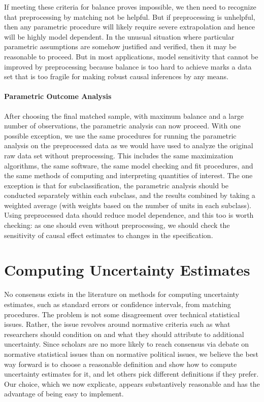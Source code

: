 \documentclass[11pt,titlepage]{article}
\begin{document}
If meeting these criteria for balance proves impossible, we then need
to recognize that preprocessing by matching not be helpful.  But if
preprocessing is unhelpful, then any parametric procedure will likely
require severe extrapolation and hence will be highly model dependent.
In the unusual situation where particular parametric assumptions are
somehow justified and verified, then it may be reasonable to proceed.
But in most applications, model sensitivity that cannot be improved by
preprocessing because balance is too hard to achieve marks a data set
that is too fragile for making robust causal inferences by any means.

\paragraph{Parametric Outcome Analysis}  
After choosing the final matched sample, with maximum balance and a
large number of observations, the parametric analysis can now proceed.
With one possible exception, we use the same procedures for running
the parametric analysis on the preprocessed data as we would have used
to analyze the original raw data set without preprocessing.  This
includes the same maximization algorithms, the same software, the same
model checking and fit procedures, and the same methods of computing
and interpreting quantities of interest.  The one exception is that
for subclassification, the parametric analysis should be conducted
separately within each subclass, and the results combined by taking a
weighted average (with weights based on the number of units in each
subclass).  Using preprocessed data should reduce model dependence,
and this too is worth checking: as one should even without
preprocessing, we should check the sensitivity of causal effect
estimates to changes in the specification.

\section{Computing Uncertainty Estimates}

No consensus exists in the literature on methods for computing
uncertainty estimates, such as standard errors or confidence
intervals, from matching procedures.  The problem is not some
disagreement over technical statistical issues.  Rather, the issue
revolves around normative criteria such as what researchers should
condition on and what they should attribute to additional uncertainty.
Since scholars are no more likely to reach consensus via debate on
normative statistical issues than on normative political issues, we
believe the best way forward is to choose a reasonable definition and
show how to compute uncertainty estimates for it, and let others pick
different definitions if they prefer.  Our choice, which we now
explicate, appears substantively reasonable and has the advantage of
being easy to implement.
\end{document}
